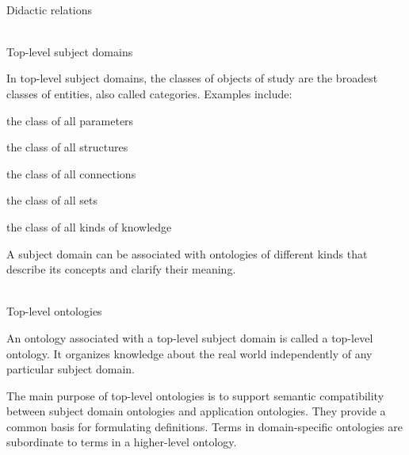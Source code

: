 \begin{frame}{\\Didactic relations}
	\topline
	\justifying
	\begin{SCn}
	\end{SCn}
\end{frame}

\begin{frame}{\\Top-level subject domains}
	\topline
	\justifying

	In top-level subject domains, the classes of objects of study are the broadest classes of entities, also called categories. Examples include:
	\begin{textitemize}
		\item the class of all parameters
		\item the class of all structures
		\item the class of all connections
		\item the class of all sets
		\item the class of all kinds of knowledge
	\end{textitemize}

	A subject domain can be associated with ontologies of different kinds that describe its concepts and clarify their meaning.
\end{frame}

\begin{frame}{\\Top-level ontologies}
	\topline
	\justifying

	An ontology associated with a top-level subject domain is called a top-level ontology. It organizes knowledge about the real world independently of any particular subject domain.
	\bigskip

	The main purpose of top-level ontologies is to support semantic compatibility between subject domain ontologies and application ontologies. They provide a common basis for formulating definitions. Terms in domain-specific ontologies are subordinate to terms in a higher-level ontology.
\end{frame}

